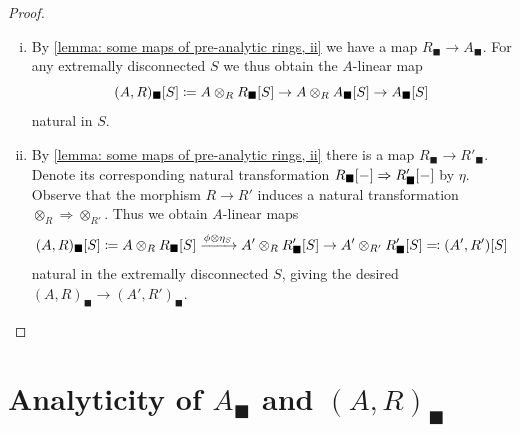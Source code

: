 \begin{proof}
\begin{enumerate}[(i)]
		Now if both $R$ and $A$ are general, then any finitely generated $\Z$-subalgebra $R'$ gives rise to a map $R'_\blacksquare \to A_\blacksquare$ by the previous paragraph. Hence we obtain an $R$-linear map
		$$\free{R_\blacksquare}{S} \ldef \colimit_{R'\subseteq R} R\otimes_{R'}\free{R'_\blacksquare}{S} \to \free{A_\blacksquare}{S}$$
		natural in the extremally disconnected $S$ from the compatible morphisms $R\otimes_{R'} \free{R'_\blacksquare}{S} \to R\otimes_{R'} \free{A_\blacksquare}{S} \to \free{A_\blacksquare}{S}$ where the second map is $R$-multiplication on the $R$-module $\free{A_\blacksquare}{S}$. This gives the desired $R_\blacksquare \to A_\blacksquare$.
		
		\item
		By \ref{lemma: some maps of pre-analytic rings, ii} we have a map $R_\blacksquare\to A_\blacksquare$. For any extremally disconnected $S$ we thus obtain the $A$-linear map
		$${(A, R)_\blacksquare[S]}\coloneqq A\otimes_R {R_\blacksquare[S]} \to A\otimes_R {A_\blacksquare[S]} \to {A_\blacksquare[S]}$$
		natural in $S$.
		
		\item 
		By \ref{lemma: some maps of pre-analytic rings, ii} there is a map $R_\blacksquare \to R'_\blacksquare$. Denote its corresponding natural transformation ${R_\blacksquare[-]}\Rightarrow {R'_\blacksquare[-]}$ by $\eta$. Observe that the morphism $R\to R'$ induces a natural transformation $\otimes_R \Rightarrow \otimes_{R'}$. Thus we obtain $A$-linear maps
		$${(A, R)_\blacksquare[S]} \coloneqq A\otimes_R {R_\blacksquare[S]} \xrightarrow{\phi\otimes \eta_S} A'\otimes_R {R'_\blacksquare[S]} \to A'\otimes_{R'} {R'_\blacksquare[S]} \eqqcolon {(A', R')[S]}$$
		natural in the extremally disconnected $S$, giving the desired $(A, R)_\blacksquare \to (A', R')_\blacksquare$.
	\end{enumerate}
\end{proof}



\newpage
\section{Analyticity of \texorpdfstring{$A_\blacksquare$ and $(A, R)_\blacksquare$}{Solid Rings}}
\label{section: analyticity of Ablack and (A, R)black}

